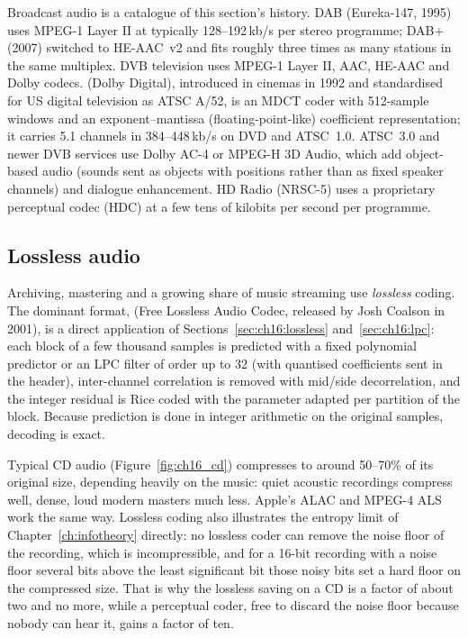 
\begin{inpractice}
Broadcast audio is a catalogue of this section's history. DAB (Eureka-147, 1995) uses MPEG-1 Layer II at
typically 128--192\,kb/s per stereo programme; DAB+ (2007) switched to HE-AAC~v2 and fits roughly three
times as many stations in the same multiplex. DVB television uses MPEG-1 Layer II, AAC, HE-AAC and Dolby
codecs.  (Dolby Digital), introduced in cinemas in 1992 and standardised for US digital
television as ATSC A/52, is an MDCT coder with 512-sample windows and an exponent--mantissa
(floating-point-like) coefficient representation; it carries 5.1 channels in 384--448\,kb/s on DVD and
ATSC~1.0. ATSC~3.0 and newer DVB services use Dolby AC-4 or MPEG-H 3D Audio, which add object-based
audio (sounds sent as objects with positions rather than as fixed speaker channels) and dialogue
enhancement. HD Radio (NRSC-5) uses a proprietary perceptual codec (HDC) at a few tens of kilobits per
second per programme.
\end{inpractice}

\subsection{Lossless audio}

Archiving, mastering and a growing share of music streaming use \emph{lossless} coding. The
dominant format,  (Free Lossless Audio Codec, released by Josh Coalson in 2001), is a direct
application of Sections~\ref{sec:ch16:lossless} and~\ref{sec:ch16:lpc}: each block of a few thousand
samples is predicted with a fixed polynomial predictor or an LPC filter of order up to 32 (with
quantised coefficients sent in the header), inter-channel correlation is removed with mid/side
decorrelation, and the integer residual is Rice coded with the parameter adapted per partition of the
block. Because prediction is done in integer arithmetic on the original samples, decoding is exact.


Typical CD audio (Figure~\ref{fig:ch16_cd}) compresses to around 50--70\% of its original size, depending heavily on the music:
quiet acoustic recordings compress well, dense, loud modern masters much less. Apple's ALAC and MPEG-4
ALS work the same way. Lossless coding also illustrates the entropy limit of
Chapter~\ref{ch:infotheory} directly: no lossless coder can remove the noise floor of the recording,
which is incompressible, and for a 16-bit recording with a noise floor several bits above the least
significant bit those noisy bits set a hard floor on the compressed size. That is why the lossless
saving on a CD is a factor of about two and no more, while a perceptual coder, free to discard the
noise floor because nobody can hear it, gains a factor of ten.

